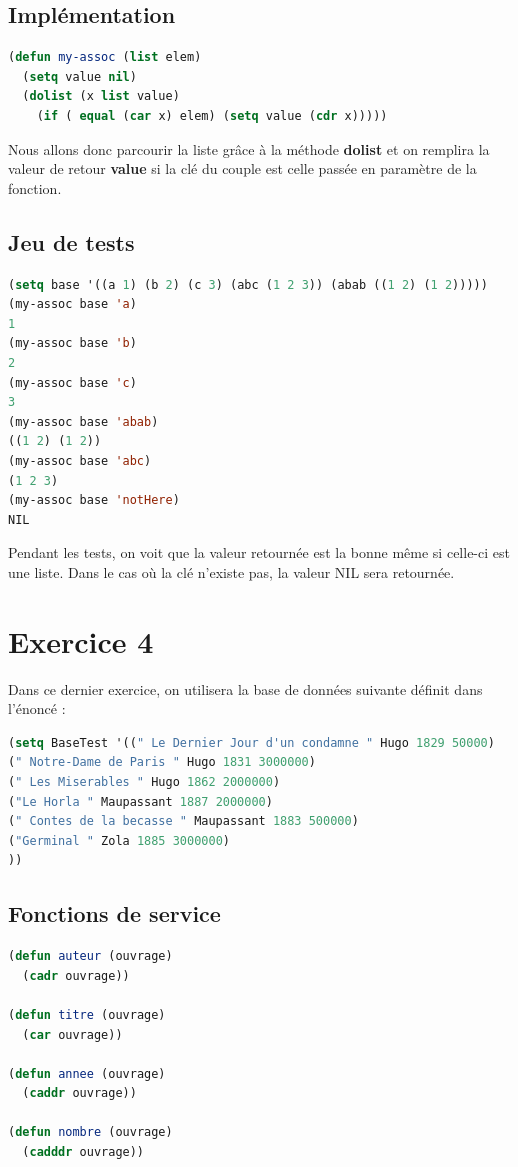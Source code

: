\documentclass[a4paper,10pt]{report}
\begin{document}
	  \section{Implémentation}
	  \begin{lstlisting}[language=Lisp]
(defun my-assoc (list elem)
  (setq value nil)
  (dolist (x list value)
    (if ( equal (car x) elem) (setq value (cdr x)))))
	  \end{lstlisting}

	  Nous allons donc parcourir la liste grâce à la méthode \textbf{dolist} et on remplira la valeur de retour \textbf{value} si la clé du couple est celle passée en paramètre de la fonction.
	  
	  \section{Jeu de tests}
	  
	  \begin{lstlisting}[language=lisp]
(setq base '((a 1) (b 2) (c 3) (abc (1 2 3)) (abab ((1 2) (1 2)))))
(my-assoc base 'a)
1
(my-assoc base 'b)
2
(my-assoc base 'c)
3
(my-assoc base 'abab)
((1 2) (1 2))
(my-assoc base 'abc)
(1 2 3)
(my-assoc base 'notHere)
NIL
	  \end{lstlisting}
Pendant les tests, on voit que la valeur retournée est la bonne même si celle-ci est une liste. Dans le cas où la clé n'existe pas, la valeur NIL sera retournée.
	  
	  
	  \chapter{Exercice 4} 
	  
	  Dans ce dernier exercice, on utilisera la base de données suivante définit dans l’énoncé :
	  \begin{lstlisting}[language=Lisp]
(setq BaseTest '((" Le Dernier Jour d'un condamne " Hugo 1829 50000)
(" Notre-Dame de Paris " Hugo 1831 3000000)
(" Les Miserables " Hugo 1862 2000000)
("Le Horla " Maupassant 1887 2000000)
(" Contes de la becasse " Maupassant 1883 500000)
("Germinal " Zola 1885 3000000)
))
	  \end{lstlisting}
	  
	  \section{Fonctions de service}
	  
	  \begin{lstlisting}[language=Lisp]
(defun auteur (ouvrage)
  (cadr ouvrage))

(defun titre (ouvrage)
  (car ouvrage))

(defun annee (ouvrage)
  (caddr ouvrage))

(defun nombre (ouvrage)
  (cadddr ouvrage))
	  \end{lstlisting}
	  
\end{document}
